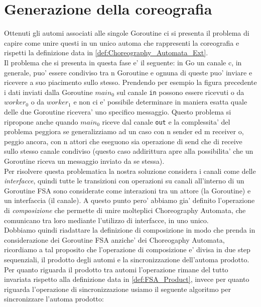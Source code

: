 \section{Generazione della coreografia}
Ottenuti gli automi associati alle singole Goroutine ci si presenta il problema di capire come unire questi in un unico automa che rappresenti la coreografia e rispetti la definizione data in \ref{def:Choreography_Automata_Ext}.\bigskip \\
Il problema che si presenta in questa fase e' il seguente: in Go un canale c, in generale, puo' essere condiviso tra n Goroutine e ognuna di queste puo' inviare e ricevere a suo piacimento sullo stesso. Prendendo per esempio la figura precedente i dati inviati dalla Goroutine $main_0$ sul canale \texttt{in} possono essere ricevuti o da $worker_0$ o da $worker_1$ e non ci e' possibile determinare in maniera esatta quale delle due Goroutine ricevera' uno specifico messaggio. Questo problema si ripropone anche quando $main_0$ riceve dal canale \texttt{out} e la complessita' del problema peggiora se generalizziamo ad un caso con n sender ed m receiver o, peggio ancora, con n attori che eseguono sia operazione di send che di receive sullo stesso canale condiviso (questo caso addirittura apre alla possibilita' che un Goroutine riceva un messaggio inviato da se stessa). \bigskip \\
Per risolvere questa problematica la nostra soluzione considera i canali come delle \emph{interfacce}, quindi tutte le transizioni con operazioni su canali all'interno di un Goroutine FSA sono considerate come interazioni tra un attore (la Goroutine) e un interfaccia (il canale). A questo punto pero' abbiamo gia' definito l'operazione di \emph{composizione} che permette di unire molteplici Choreography Automata, che comunicano tra loro mediante l'utilizzo di interfacce, in uno unico.\\
Dobbiamo quindi riadattare la definizione di composizione in modo che prenda in considerazione dei Goroutine FSA anziche' dei Choreogaphy Automata, ricordiamo a tal proposito che l'operazione di composizione e' divisa in due step sequenziali, il prodotto degli automi e la sincronizzazione dell'automa prodotto. Per quanto riguarda il prodotto tra automi l'operazione rimane del tutto invariata rispetto alla definizione data in \ref{def:FSA_Product}, invece per quanto riguarda l'operazione di sincronizzazione usiamo il seguente algoritmo per sincronizzare l'automa prodotto:
